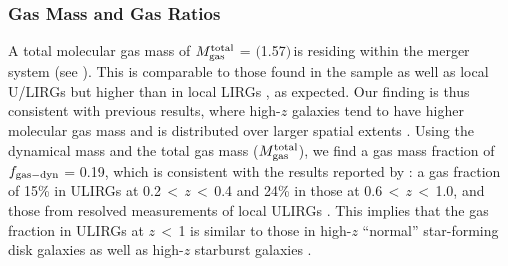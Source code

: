 \documentclass[]{emulateapj}
\begin{document}
\subsubsection{Gas Mass and Gas Ratios}
A total molecular gas mass of
$M_{\rm gas}^{\rm total}$ = $($1.57$)$\,\Msun is
residing within the merger system (see ).
This is comparable to those found in the
 sample %
as well as local U/LIRGs
\citep[][]{Sanders96a} but higher than
in local LIRGs , as expected.
Our finding is thus consistent with previous results, where
high-$z$ galaxies tend to have higher molecular gas mass %
and is
distributed over larger spatial extents
.
Using the dynamical mass and the total
gas mass ($M_{\rm gas}^{\rm total}$), we find a gas mass
fraction of $f_{\rm gas-dyn}$ = 0.19, which is
consistent with the results reported by :
a gas fraction of 15\% in ULIRGs at 0.2\,$<$\,$z$\,$<$\,0.4 and 24\%
in those at 0.6\,$<$\,$z$\,$<$\,1.0, and those from resolved measurements of local ULIRGs .
This implies that the gas fraction in ULIRGs at $z$\,$<$\,1 is
similar to those in high-$z$ ``normal'' star-forming disk galaxies
\citep[assuming an \alphaco conversion factor of 0.8 \alphaU;][]{Daddi10a,Tacconi10a} as well as
high-$z$ starburst galaxies
\citep[with similar CO sizes between the two populations (see ); cf. smaller CO sizes from earlier studies; ]{Bothwell13a}.
\end{document}
